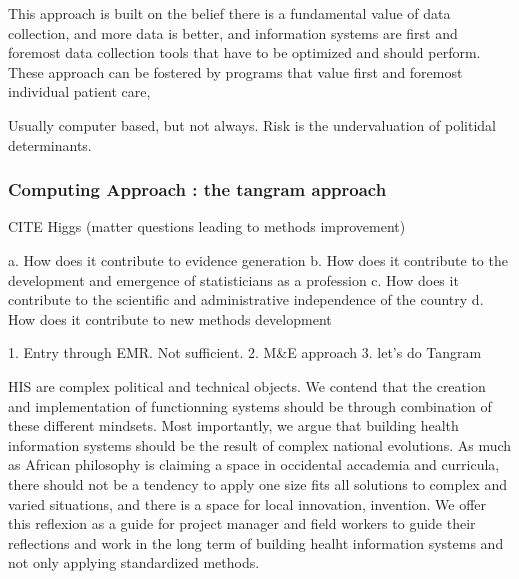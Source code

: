 This approach is built on the belief there is a fundamental value of data collection, and more data is better, and information systems are first and foremost data collection tools that have to be optimized and should perform. These approach can be fostered by programs that value first and foremost individual patient care,

Usually computer based, but not always. Risk is the undervaluation of politidal determinants.

\subsubsection{Computing Approach : the tangram approach}

\cite{wagenaar_using_2016}
CITE Higgs (matter questions leading to methods improvement)




a. How does it contribute to evidence generation
b. How does it contribute to the development and emergence of statisticians as a profession
c. How does it contribute to the scientific and administrative independence of the country
d. How does it contribute to new methods development


1. Entry through EMR. Not sufficient.
2. M\&E approach
3. let's do Tangram

HIS are complex political and technical objects. We contend that the creation and implementation of functionning systems should be through combination of these different mindsets. Most importantly, we argue that building health information systems should be the result of complex national evolutions. As much as African philosophy is claiming a space in occidental accademia and curricula, there should not be a tendency to apply one size fits all solutions to complex and varied situations, and there is a space for local innovation, invention. We offer this reflexion as a guide for project manager and field workers to guide their reflections and work in the long term of building healht information systems and not only applying standardized methods.



